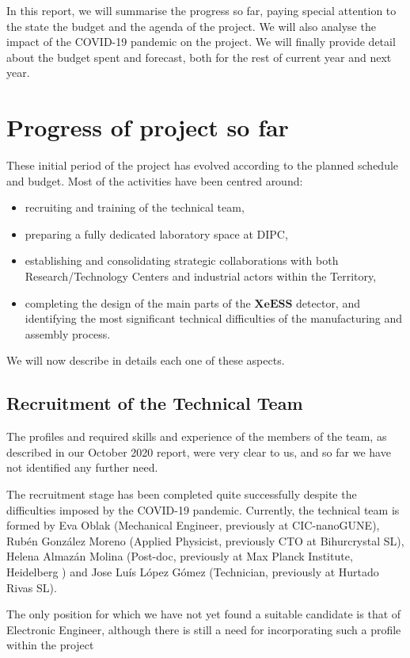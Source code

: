 \documentclass[12pt,a4paper,article]{report} %
\begin{document}
In this report, we will summarise the progress so far, paying special attention to the state the budget and the  agenda of the project. We will also analyse the impact of the COVID-19 pandemic on the project. We will finally provide detail about the budget spent and forecast, both for the rest of current year and next year. 


\newpage
\section*{Progress of project so far}


These initial period of the project has evolved according to the planned schedule and budget. Most of the activities have been centred around:
\begin{itemize} 
\item recruiting and training of the technical team,
\item preparing a fully dedicated laboratory space at DIPC,
\item establishing and consolidating strategic collaborations with both  Research/Technology Centers and industrial actors within the Territory,
\item completing the design of the main parts of the $\mathbf{XeESS}$  detector, and identifying the most significant technical difficulties of the manufacturing and assembly process. 
\end{itemize}
We will now describe in details each one of these aspects.
\subsection*{Recruitment of the Technical Team}
The profiles and required skills and experience of the members of the team, as described in our October 2020 report, were very clear to us, and so far we have not identified any further need.

 The recruitment stage has been completed quite successfully despite the difficulties imposed by the COVID-19 pandemic. Currently, the technical team is formed by Eva Oblak (Mechanical Engineer, previously at CIC-nanoGUNE), Rubén González Moreno (Applied Physicist, previously CTO at Bihurcrystal SL), Helena Almazán Molina (Post-doc, previously at Max Planck Institute, Heidelberg ) and Jose Luís López Gómez (Technician, previously at Hurtado Rivas SL). 
 
 The only position for which we have not yet found a suitable candidate is that of Electronic Engineer, although there is still a need for incorporating such a profile within the project
 
\end{document}
